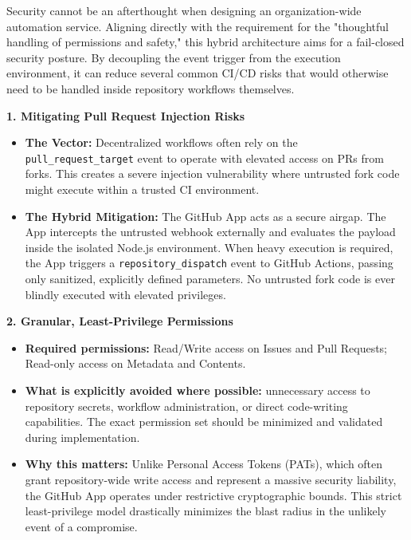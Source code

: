 \documentclass[11pt]{article}
\newcommand{\mainheading}[1]{\par\vspace{10pt}\noindent{\fontsize{15pt}{18pt}\selectfont\textcolor{headingblue}{#1}}
\par\vspace{4pt}}
\begin{document}
\mainheading{6. Security Model}

Security cannot be an afterthought when designing an organization-wide automation service. Aligning directly with the requirement for the "thoughtful handling of permissions and safety," this hybrid architecture aims for a fail-closed security posture. By decoupling the event trigger from the execution environment, it can reduce several common CI/CD risks that would otherwise need to be handled inside repository workflows themselves.

\vspace{5pt}
\noindent
\textbf{1. Mitigating Pull Request Injection Risks}
\begin{itemize}[leftmargin=18pt,itemsep=2pt,topsep=0pt]
\item \textbf{The Vector:} Decentralized workflows often rely on the \texttt{pull\_request\_target} event to operate with elevated access on PRs from forks. This creates a severe injection vulnerability where untrusted fork code might execute within a trusted CI environment.
\item \textbf{The Hybrid Mitigation:} The GitHub App acts as a secure airgap. The App intercepts the untrusted webhook externally and evaluates the payload inside the isolated Node.js environment. When heavy execution is required, the App triggers a \texttt{repository\_dispatch} event to GitHub Actions, passing only sanitized, explicitly defined parameters. No untrusted fork code is ever blindly executed with elevated privileges.
\end{itemize}

\vspace{5pt}
\noindent
\textbf{2. Granular, Least-Privilege Permissions}
\begin{itemize}[leftmargin=18pt,itemsep=2pt,topsep=0pt]
\item \textbf{Required permissions:} Read/Write access on Issues and Pull Requests; Read-only access on Metadata and Contents.
\item \textbf{What is explicitly avoided where possible:} unnecessary access to repository secrets, workflow administration, or direct code-writing capabilities. The exact permission set should be minimized and validated during implementation.
\item \textbf{Why this matters:} Unlike Personal Access Tokens (PATs), which often grant repository-wide write access and represent a massive security liability, the GitHub App operates under restrictive cryptographic bounds. This strict least-privilege model drastically minimizes the blast radius in the unlikely event of a compromise.
\end{itemize}
\end{document}
